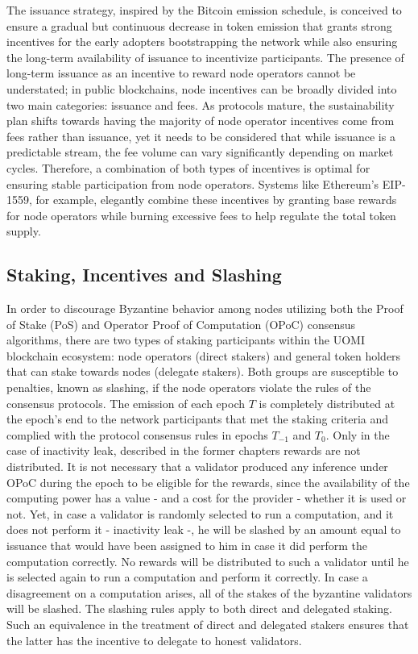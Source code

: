 \documentclass{article}
\begin{document}
The issuance strategy, inspired by the Bitcoin emission schedule, is conceived to ensure a gradual but continuous decrease in token emission that grants strong incentives for the early adopters bootstrapping the network while also ensuring the long-term availability of issuance to incentivize participants.
The presence of long-term issuance as an incentive to reward node operators cannot be understated; in public blockchains, node incentives can be broadly divided into two main categories: issuance and fees. As protocols mature, the sustainability plan shifts towards having the majority of node operator incentives come from fees rather than issuance, yet it needs to be considered that while issuance is a predictable stream, the fee volume can vary significantly depending on market cycles. Therefore, a combination of both types of incentives is optimal for ensuring stable participation from node operators. Systems like Ethereum’s EIP-1559, for example, elegantly combine these incentives by granting base rewards for node operators while burning excessive fees to help regulate the total token supply. 

\subsection{Staking, Incentives and Slashing}

In order to discourage Byzantine behavior among nodes utilizing both the Proof of Stake (PoS) and Operator Proof of Computation (OPoC) consensus algorithms, there are two types of staking participants within the UOMI blockchain ecosystem: node operators (direct stakers) and general token holders that can stake towards nodes (delegate stakers). Both groups are susceptible to penalties, known as slashing, if the node operators violate the rules of the consensus protocols. 
The emission of each epoch \(T\) is completely distributed at the epoch's end to the network participants that met the staking criteria and complied with the protocol consensus rules in epochs \( T_{-1} \) and \(T_0\). Only in the case of inactivity leak, described in the former chapters rewards are not distributed. It is not necessary that a validator produced any inference under OPoC during the epoch to be eligible for the rewards, since the availability of the computing power has a value - and a cost for the provider - whether it is used or not. 
Yet, in case a validator is randomly selected to run a computation, and it does not perform it - inactivity leak -, he will be slashed by an amount equal to issuance that would have been assigned to him in case it did perform the computation correctly. No rewards will be distributed to such a validator until he is selected again to run a computation and perform it correctly. In case a disagreement on a computation arises, all of the stakes of the byzantine validators will be slashed. The slashing rules apply to both direct and delegated staking. Such an equivalence in the treatment of direct and delegated stakers ensures that the latter has the incentive to delegate to honest validators.
\end{document}
